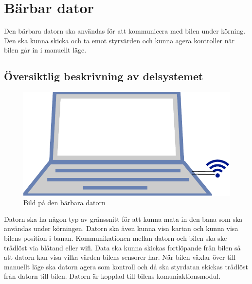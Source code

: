 \documentclass[systemskiss/skiss.tex]{subfiles}
\begin{document}
\section{Bärbar dator}
Den bärbara datorn ska användas för att kommunicera med bilen under körning. Den ska kunna skicka och ta emot styrvärden och kunna agera kontroller när bilen går in i manuellt läge.
\subsection{Översiktlig beskrivning av delsystemet}
\begin{figure}[h]
    \centering
    \includegraphics[width=0.6\linewidth]{systemskiss/figures/laptop.pdf}
    \caption{Bild på den bärbara datorn}
    \label{fig:laptopskiss}
\end{figure}
\noindent
Datorn ska ha någon typ av gränssnitt för att kunna mata in den bana som ska användas under körningen. Datorn ska även kunna visa kartan och kunna visa bilens position i banan. Kommunikationen mellan datorn och bilen ska ske trådlöst via blåtand eller wifi. Data ska kunna skickas fortlöpande från bilen så att datorn kan visa vilka värden bilens sensorer har. När bilen växlar över till manuellt läge ska datorn agera som kontroll och då ska styrdatan skickas trådlöst från datorn till bilen. Datorn är kopplad till bilens komuniaktionsmodul.
\end{document}
